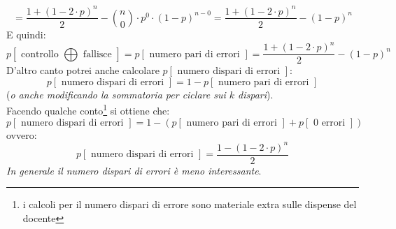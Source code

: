 \documentclass[a4paper,12pt, oneside]{book}
\begin{document}
\[=\frac{1+(1-2\cdot p)^n}{2}-  {{n}\choose{0}}\cdot
  p^{0}\cdot(1-p)^{n-0}=\frac{1+(1-2\cdot p)^n}{2}-(1-p)^n\]
E quindi:
{\small{\[p[\mbox{ controllo }\bigoplus \mbox{ fallisce }]=p[\mbox{ numero pari
        di errori }]=\frac{1+(1-2\cdot p)^n}{2}-(1-p)^n\]}}
D'altro canto potrei anche calcolare $p[\mbox{ numero dispari di errori }]$:
\[p[\mbox{ numero dispari di errori }]=1-p[\mbox{ numero pari di errori }]\]
(\textit{o anche modificando la sommatoria per ciclare sui $k$ dispari}).\\
Facendo qualche conto\footnote{i calcoli
  per il numero dispari di errore sono materiale extra sulle dispense del
  docente} si ottiene che: 
\[p[\mbox{ numero dispari di errori }]=1-(p[\mbox{ numero pari di errori
  }]+p[\mbox{ 0 errori }])\]
ovvero:
\[p[\mbox{ numero dispari di errori }]=\frac{1-(1-2\cdot p)^n}{2}\]
\textit{In generale il numero dispari di errori è meno interessante}.\\
\end{document}
